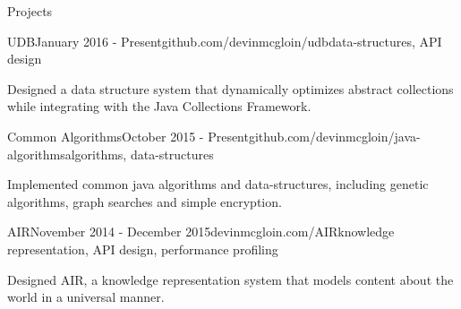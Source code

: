 \documentclass{resume} %
\begin{document}
\begin{rSection}{Projects}


\begin{rSubsection}{UDB}{January 2016 - Present}{github.com/devinmcgloin/udb}{data-structures, API design}
\item Designed a data structure system that dynamically optimizes abstract collections while integrating with the Java Collections Framework. 
\end{rSubsection}


\begin{rSubsection}{Common Algorithms}{October 2015 - Present}{github.com/devinmcgloin/java-algorithms}{algorithms, data-structures}
\item Implemented common java algorithms and data-structures, including genetic algorithms, graph searches and simple encryption.
\end{rSubsection}





\begin{rSubsection}{AIR}{November 2014 - December 2015}{devinmcgloin.com/AIR}{knowledge representation, API design, performance profiling}
\item Designed AIR, a knowledge representation system that models content about the world in a universal manner. 
\end{rSubsection}
\end{rSection}
\end{document}
